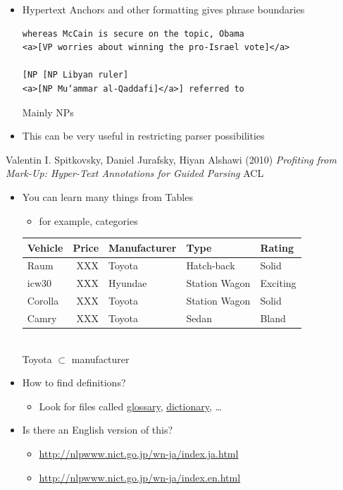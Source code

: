 \documentclass[a4paper,landscape,headrule,footrule,xetex]{foils}
\begin{document}

\begin{itemize}
\item Hypertext Anchors and other formatting gives phrase boundaries
\begin{verbatim}
whereas McCain is secure on the topic, Obama
<a>[VP worries about winning the pro-Israel vote]</a>

[NP [NP Libyan ruler]
<a>[NP Mu‘ammar al-Qaddafi]</a>] referred to
\end{verbatim}
  Mainly NPs 
\item This can be very useful in restricting parser possibilities
\end{itemize}


Valentin I. Spitkovsky, Daniel Jurafsky, Hiyan Alshawi (2010) \textit{Profiting from Mark-Up: Hyper-Text Annotations for Guided Parsing} ACL


\MyLogo{}
 \begin{itemize}
 \item You can learn many things from Tables
   \begin{itemize}
   \item for example, categories
   \end{itemize}
   \begin{tabular}{lrlll}
     \textbf{Vehicle} & \textbf{Price} & \textbf{Manufacturer} & \textbf{Type} & \textbf{Rating} \\
     \hline
     Raum & XXX & Toyota & Hatch-back & Solid \\
     icw30 & XXX & Hyundae & Station Wagon & Exciting \\
     Corolla & XXX & Toyota & Station Wagon & Solid \\
     Camry & XXX & Toyota & Sedan & Bland
   \end{tabular}
   \\[3ex] Toyota $\subset$ manufacturer
 \end{itemize}

 \begin{itemize}
 \item How to find definitions?
   \begin{itemize}
   \item Look for files called \url{glossary}, \url{dictionary}, \ldots
   \end{itemize}
 \item Is there an English version of this?
   \begin{itemize}
   \item \url{http://nlpwww.nict.go.jp/wn-ja/index.ja.html}
   \item \url{http://nlpwww.nict.go.jp/wn-ja/index.en.html}
   \end{itemize}
 \end{itemize}
\end{document}
